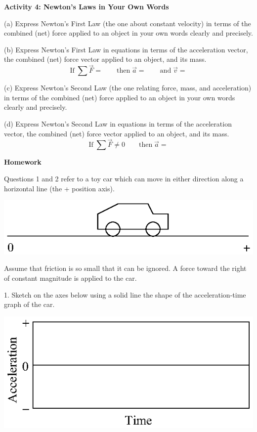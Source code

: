 \pagebreak[2]
\textbf{Activity 4: Newton's Laws in Your Own Words} 

(a) Express Newton's First Law (the one about constant velocity) in terms of
the combined (net) force applied to an object in your own words clearly and
precisely.
\vspace{20mm}

(b) Express Newton's First Law in equations in terms of the acceleration vector,
the combined (net) force vector applied to an object, and its mass.
\[
\mbox{If}\; \sum {\vec F}= \qquad \mbox{then}\; {\vec a}=
\qquad \mbox{and}\; {\vec v}=\]


(c) Express Newton's Second Law (the one relating force, mass, and acceleration)
in terms of the combined (net) force applied to an object in your own words
clearly and precisely.
\vspace{20mm}

(d) Express Newton's Second Law in equations in terms of the acceleration vector,
the combined (net) force vector applied to an object, and its mass.
\[
\mbox{If}\; \sum {\vec F}\neq 0\qquad \mbox{then}\; 
{\vec a}=\]


\textbf{Homework} 

Questions 1 and 2 refer to a toy car which can move in either direction along
a horizontal line (the + position axis).

{\par\centering \includegraphics{force2/force2_fig6.eps} \par}

Assume that friction is so small that it can be ignored. A force toward the
right of constant magnitude is applied to the car. 

1. Sketch on the axes below using a solid line the shape of the acceleration-time
graph of the car.

{\par\centering \includegraphics{force_mass/force_mass_fig1.eps} \par}

